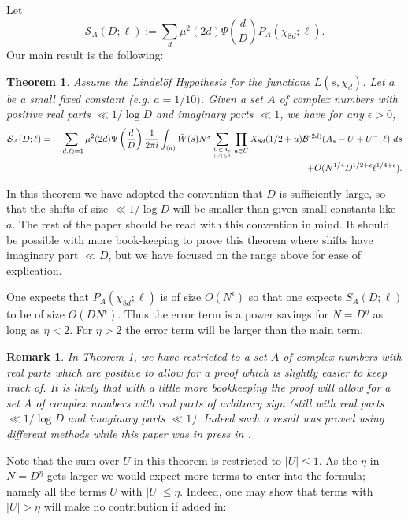 \documentclass[12pt]{amsart}
\newtheorem{theorem}{Theorem}
\newtheorem{remark}{Remark}
\begin{document}
	Let
	$$\mathcal S_A(D;\ell):=\sum_{d}\mu^2(2d) \Psi\left(\frac d {D}\right) P_A(\chi_{8d};\ell).$$
	Our main result is the following:
	\begin{theorem}
		\label{thm:main} 
		Assume the Lindel\"{o}f Hypothesis for the functions $L(s,\chi_d)$. Let $a$ be a small fixed constant (e.g. $a = 1/10)$. Given a set $A$ of complex numbers with positive real parts $\ll 1/\log D$ and imaginary parts $\ll 1$, we have for any $\epsilon > 0$, 
		\begin{eqnarray*}  \mathcal S_A(D;\ell)
			&=&
			\sum_{(d,\ell)=1 } \mu^2(2d) \Psi\left(\frac d{D}\right) 
			\frac{1}{2\pi i}\int_{(a)}\breve W(s) N^s 
			\sum_{U\subset A_s\atop |U|\le 1} \prod_{u\in U} X_{8d}(1/2 +u) \mathcal B^{(2d)}(A_s-U+U^-;\ell) ~ds\\
			&&\qquad +O(N^{1/4}D^{1/2+\epsilon} \ell^{1/4+\epsilon}).
		\end{eqnarray*}
	\end{theorem}
	
	In this theorem we have adopted the convention that $D$ is sufficiently large, so that the shifts of size $\ll 1/\log D$ will be smaller than given small constants like $a$. The rest of the paper should be read with this convention in mind. It should be possible with more book-keeping to prove this theorem where shifts have imaginary part $\ll D$, but we have focused on the range above for ease of explication.
	
	One expects that $P_A(\chi_{8d}; \ell)$ is of size $O(N^{\epsilon})$ so that one expects $S_A(D; \ell)$ to be of size $O(D N^\epsilon)$. Thus the error term is a power savings for $N = D^\eta$ as long as $\eta < 2$. For $\eta > 2$ the error term will be larger than the main term.
	
	\begin{remark}
	In Theorem \ref{thm:main}, we have restricted to a set $A$ of complex numbers with real parts which are positive to allow for a proof which is slightly easier to keep track of. It is likely that with a little more bookkeeping the proof will allow for a set $A$ of complex numbers with real parts of arbitrary sign (still with real parts $\ll 1/\log D$ and imaginary parts $\ll 1$). Indeed such a result was proved using different methods while this paper was in press in \cite{Ce}.
	\end{remark}
	
	Note that the sum over $U$ in this theorem is restricted  to $|U|\le 1$.  As the $\eta$ in $N=D^\eta$ gets larger we would expect more terms to enter into the formula; namely all the terms $U$ with $|U| \leq \eta$. Indeed, one may show that terms with $|U| > \eta$ will make no contribution if added in:
	
\end{document}
